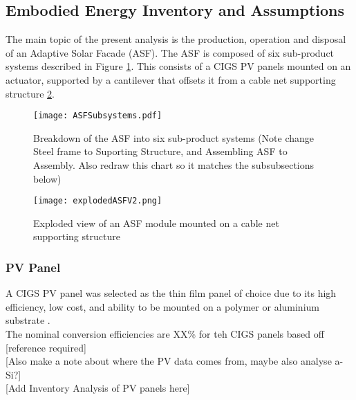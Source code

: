 
\subsection{Embodied Energy Inventory and Assumptions}

The main topic of the present analysis is the production, operation and disposal of an Adaptive Solar Facade (ASF). The ASF is composed of six sub-product systems described in Figure \ref{fig:subsystem}. This consists of a CIGS PV panels mounted on an actuator, supported by a cantilever that offsets it from a cable net supporting structure \ref{fig:explodedView}.

\begin{figure}[H]
\begin{center}
\texttt{[image: ASFSubsystems.pdf]}
\caption{Breakdown of the ASF into six sub-product systems (Note change Steel frame to Suporting Structure, and Assembling ASF to Assembly. Also redraw this chart so it matches the subsubsections below)}
\label{fig:subsystem}
\end{center}
\end{figure}

\begin{figure}[H]
\begin{center}
\texttt{[image: explodedASFV2.png]}
\caption{Exploded view of an ASF module mounted on a cable net supporting structure}
\label{fig:explodedView}
\end{center}
\end{figure}

\subsubsection*{PV Panel}
A CIGS PV panel was selected as the thin film panel of choice due to its high efficiency, low cost, and ability to be mounted on a polymer or aluminium substrate \cite{chirilua2011highly}.\\

The nominal conversion efficiencies are XX\% for teh CIGS panels based off [reference required]\\

[Also make a note about where the PV data comes from, maybe also analyse a-Si?]\\

[Add Inventory Analysis of PV panels here]

